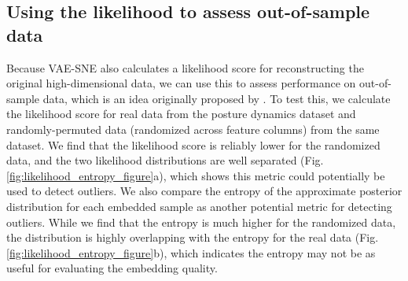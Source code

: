 \documentclass[11pt,a4paper,oneside]{book}
\begin{document}
\subsection{Using the likelihood to assess out-of-sample data}
Because VAE-SNE also calculates a likelihood score for reconstructing the original high-dimensional data, we can use this to assess performance on out-of-sample data, which is an idea originally proposed by \cite{ding2018scvis}. To test this, we calculate the likelihood score for real data from the posture dynamics dataset \citep{berman2014mapping, berman2016predictability, pereira2019fast} and randomly-permuted data (randomized across feature columns) from the same dataset. We find that the likelihood score is reliably lower for the randomized data, and the two likelihood distributions are well separated (Fig. \ref{fig:likelihood_entropy_figure}a), which shows this metric could potentially be used to detect outliers. We also compare the entropy of the approximate posterior distribution for each embedded sample as another potential metric for detecting outliers. While we find that the entropy is much higher for the randomized data, the distribution is highly overlapping with the entropy for the real data (Fig. \ref{fig:likelihood_entropy_figure}b), which indicates the entropy may not be as useful for evaluating the embedding quality.
\end{document}
